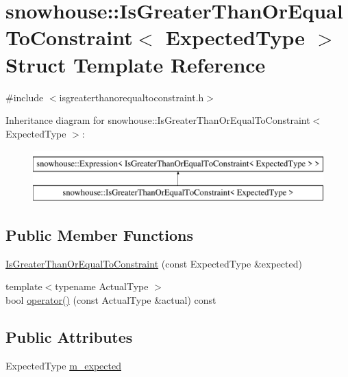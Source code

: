 \hypertarget{structsnowhouse_1_1IsGreaterThanOrEqualToConstraint}{}\section{snowhouse\+::Is\+Greater\+Than\+Or\+Equal\+To\+Constraint$<$ Expected\+Type $>$ Struct Template Reference}
\label{structsnowhouse_1_1IsGreaterThanOrEqualToConstraint}


{\ttfamily \#include $<$isgreaterthanorequaltoconstraint.\+h$>$}

Inheritance diagram for snowhouse\+::Is\+Greater\+Than\+Or\+Equal\+To\+Constraint$<$ Expected\+Type $>$\+:\begin{figure}[H]
\begin{center}
\leavevmode
\includegraphics[height=2.000000cm]{structsnowhouse_1_1IsGreaterThanOrEqualToConstraint}
\end{center}
\end{figure}
\subsection*{Public Member Functions}
\begin{DoxyCompactItemize}
\item 
\mbox{\hyperlink{structsnowhouse_1_1IsGreaterThanOrEqualToConstraint_a2ab6ba7e085d5e581d25acbc5d0bb850}{Is\+Greater\+Than\+Or\+Equal\+To\+Constraint}} (const Expected\+Type \&expected)
\item 
{\footnotesize template$<$typename Actual\+Type $>$ }\\bool \mbox{\hyperlink{structsnowhouse_1_1IsGreaterThanOrEqualToConstraint_aabc702b1e351f959dddda0f09c0365a1}{operator()}} (const Actual\+Type \&actual) const
\end{DoxyCompactItemize}
\subsection*{Public Attributes}
\begin{DoxyCompactItemize}
\item 
Expected\+Type \mbox{\hyperlink{structsnowhouse_1_1IsGreaterThanOrEqualToConstraint_a35ca131e554d1b8b06606c98fa7231c0}{m\+\_\+expected}}
\end{DoxyCompactItemize}


